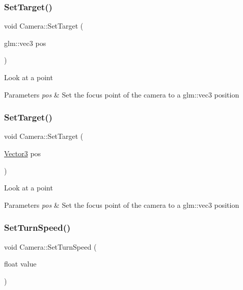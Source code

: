 \subsubsection{\texorpdfstring{SetTarget()}{SetTarget()}\hspace{0.1cm}{\footnotesize\ttfamily [1/2]}}
{\footnotesize\ttfamily void Camera\+::\+Set\+Target (\begin{DoxyParamCaption}\item[{glm\+::vec3}]{pos }\end{DoxyParamCaption})}

Look at a point 
\begin{DoxyParams}{Parameters}
{\em pos} & Set the focus point of the camera to a glm\+::vec3 position \\
\hline
\end{DoxyParams}
\mbox{\label{class_camera_a5a7426bc395b1348cfafd4e9d121af41}} 
\subsubsection{\texorpdfstring{SetTarget()}{SetTarget()}\hspace{0.1cm}{\footnotesize\ttfamily [2/2]}}
{\footnotesize\ttfamily void Camera\+::\+Set\+Target (\begin{DoxyParamCaption}\item[{\mbox{\hyperlink{struct_vector3}{Vector3}}}]{pos }\end{DoxyParamCaption})}

Look at a point 
\begin{DoxyParams}{Parameters}
{\em pos} & Set the focus point of the camera to a glm\+::vec3 position \\
\hline
\end{DoxyParams}
\mbox{\label{class_camera_af596e4ca38674668374a4486cbeb8c00}} 
\subsubsection{\texorpdfstring{SetTurnSpeed()}{SetTurnSpeed()}}
{\footnotesize\ttfamily void Camera\+::\+Set\+Turn\+Speed (\begin{DoxyParamCaption}\item[{float}]{value }\end{DoxyParamCaption})}


